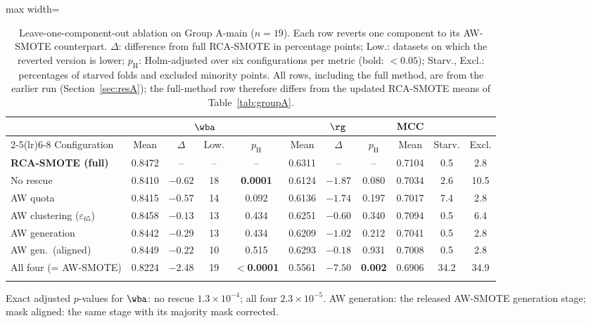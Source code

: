 \begin{table}[!htb]
\caption{Leave-one-component-out ablation on Group A-main ($n=19$). Each row reverts one component to its AW-SMOTE counterpart. $\Delta$: difference from full RCA-SMOTE in percentage points; Low.: datasets on which the reverted version is lower; $p_\mathrm{H}$: Holm-adjusted over six configurations per metric (bold: $<0.05$); Starv., Excl.: percentages of starved folds and excluded minority points. All rows, including the full method, are from the earlier run (Section~\ref{sec:resA}); the full-method row therefore differs from the updated RCA-SMOTE means of Table~\ref{tab:groupA}.}\label{tab:ablation}
\centering\tabfont
\setlength{\tabcolsep}{2.2pt}
\begin{adjustbox}{max width=\textwidth}
\begin{tabular}{@{}lcccccccccc@{}}
\toprule
 & \multicolumn{4}{c}{$\wba$} & \multicolumn{3}{c}{$\rg$} & MCC & & \\
\cmidrule(lr){2-5}\cmidrule(lr){6-8}
Configuration & Mean & $\Delta$ & Low. & $p_\mathrm{H}$ & Mean & $\Delta$ & $p_\mathrm{H}$ & Mean & Starv. & Excl. \\
\midrule
\textbf{RCA-SMOTE (full)} & 0.8472 & -- & -- & -- & 0.6311 & -- & -- & 0.7104 & 0.5 & 2.8 \\
No rescue & 0.8410 & $-0.62$ & 18 & \textbf{0.0001} & 0.6124 & $-1.87$ & 0.080 & 0.7034 & 2.6 & 10.5 \\
AW quota & 0.8415 & $-0.57$ & 14 & 0.092 & 0.6136 & $-1.74$ & 0.197 & 0.7017 & 7.4 & 2.8 \\
AW clustering ($\varepsilon_{65}$) & 0.8458 & $-0.13$ & 13 & 0.434 & 0.6251 & $-0.60$ & 0.340 & 0.7094 & 0.5 & 6.4 \\
AW generation & 0.8442 & $-0.29$ & 13 & 0.434 & 0.6209 & $-1.02$ & 0.212 & 0.7041 & 0.5 & 2.8 \\
AW gen.\ (aligned) & 0.8449 & $-0.22$ & 10 & 0.515 & 0.6293 & $-0.18$ & 0.931 & 0.7008 & 0.5 & 2.8 \\
All four (= AW-SMOTE) & 0.8224 & $-2.48$ & 19 & \textbf{$<$0.0001} & 0.5561 & $-7.50$ & \textbf{0.002} & 0.6906 & 34.2 & 34.9 \\
\botrule
\end{tabular}
\end{adjustbox}
\par\smallskip\raggedright\footnotesize Exact adjusted $p$-values for $\wba$: no rescue $1.3\times10^{-4}$; all four $2.3\times10^{-5}$. AW generation: the released AW-SMOTE generation stage; mask aligned: the same stage with its majority mask corrected.
\end{table}
